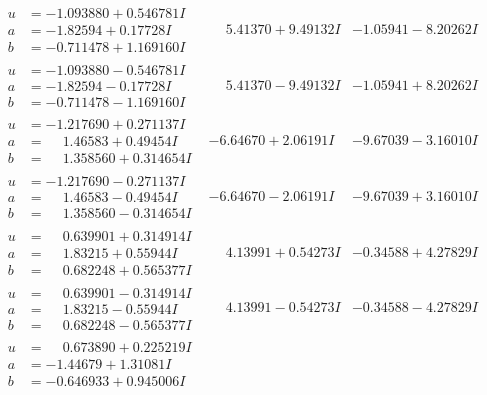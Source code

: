 \documentclass[1p]{elsarticle_modified}
\theoremstyle{definition}
\begin{document}
$$\begin{array}{c|c|c}
\begin{aligned}
u &= -1.093880 + 0.546781 I \\
a &= -1.82594 + 0.17728 I \\
b &= -0.711478 + 1.169160 I\end{aligned}
 & \phantom{-}5.41370 + 9.49132 I & -1.05941 - 8.20262 I \\ \hline\begin{aligned}
u &= -1.093880 - 0.546781 I \\
a &= -1.82594 - 0.17728 I \\
b &= -0.711478 - 1.169160 I\end{aligned}
 & \phantom{-}5.41370 - 9.49132 I & -1.05941 + 8.20262 I \\ \hline\begin{aligned}
u &= -1.217690 + 0.271137 I \\
a &= \phantom{-}1.46583 + 0.49454 I \\
b &= \phantom{-}1.358560 + 0.314654 I\end{aligned}
 & -6.64670 + 2.06191 I & -9.67039 - 3.16010 I \\ \hline\begin{aligned}
u &= -1.217690 - 0.271137 I \\
a &= \phantom{-}1.46583 - 0.49454 I \\
b &= \phantom{-}1.358560 - 0.314654 I\end{aligned}
 & -6.64670 - 2.06191 I & -9.67039 + 3.16010 I \\ \hline\begin{aligned}
u &= \phantom{-}0.639901 + 0.314914 I \\
a &= \phantom{-}1.83215 + 0.55944 I \\
b &= \phantom{-}0.682248 + 0.565377 I\end{aligned}
 & \phantom{-}4.13991 + 0.54273 I & -0.34588 + 4.27829 I \\ \hline\begin{aligned}
u &= \phantom{-}0.639901 - 0.314914 I \\
a &= \phantom{-}1.83215 - 0.55944 I \\
b &= \phantom{-}0.682248 - 0.565377 I\end{aligned}
 & \phantom{-}4.13991 - 0.54273 I & -0.34588 - 4.27829 I \\ \hline\begin{aligned}
u &= \phantom{-}0.673890 + 0.225219 I \\
a &= -1.44679 + 1.31081 I \\
b &= -0.646933 + 0.945006 I\end{aligned}

\end{array}$$
\end{document}
